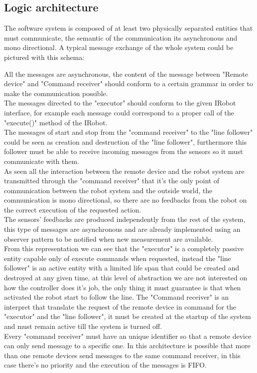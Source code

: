 \documentclass{llncs}
\begin{document}
\subsection{Logic architecture}
The software system is composed of at least two physically separated entities that must communicate, the semantic of the communication its asynchronous and mono directional. A typical message exchange of the whole system could be pictured with this schema:
\begin{center}
\end{center}
All the messages are asynchronous, the content of the message between "Remote device" and "Command receiver" should conform to a certain grammar in order to make the communication possible.\\
The messages directed to the "executor" should conform to the given IRobot interface, for example each message could correspond to a proper call of the "execute()" method of the IRobot.\\
The messages of start and stop from the "command receiver" to the "line follower" could be seen as creation and destruction of the "line follower", furthermore this follower must be able to receive incoming messages from the sensors so it must communicate with them.\\
As seen all the interaction between the remote device and the robot system are transmitted through the "command receiver" that it's the only point of communication between the robot system and the outside world, the communication is mono directional, so there are no feedbacks from the robot on the correct execution of the requested action.\\
The sensors' feedbacks are produced independently from the rest of the system, this type of messages are asynchronous and are already implemented using an observer pattern to be notified when new measurement are available.\\

From this representation we can see that the "executor" is a completely passive entity capable only of execute commands when requested, instead the "line follower" is an active entity with a limited life span that could be created and destroyed at any given time, at this level of abstraction we are not interested on how the controller does it's job, the only thing it must guarantee is that when activated the robot start to follow the line. The "Command receiver" is an interpret that translate the request of the remote device in command for the "executor" and the "line follower", it must be created at the startup of the system and must remain active till the system is turned off.\\
Every "command receiver" must have an unique identifier so that a remote device can only send message to a specific one. In this architecture is possible that more than one remote devices send messages to the same command receiver, in this case there's no priority and the execution of the messages is FIFO. 
\end{document}
